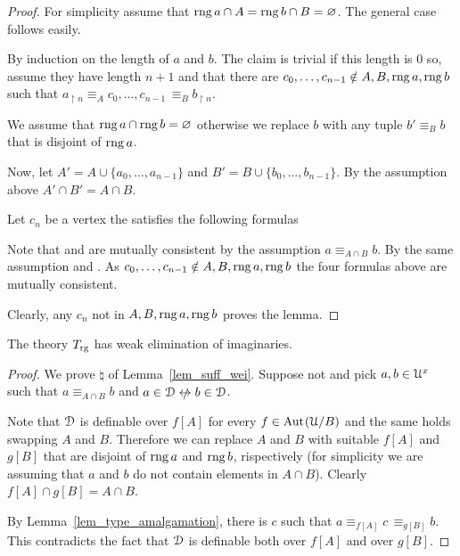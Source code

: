 \begin{proof}
  For simplicity assume that $\mathop{\rm rng} a\cap A=\mathop{\rm rng} b\cap B=\varnothing$.
  The general case follows easily.

  By induction on the length of $a$ and $b$. 
  The claim is trivial if this length is $0$ so, assume they have length $n+1$ and that there are $c_0,\dots,c_{n-1}\notin A, B,\mathop{\rm rng} a,\mathop{\rm rng} b$ such that $a_{\restriction n}\equiv_A c_0,\dots,c_{n-1}\,\equiv_B b_{\restriction n}$.

  We assume that $\mathop{\rm rng} a\cap\mathop{\rm rng} b=\varnothing$ otherwise we replace $b$ with any tuple $b'\equiv_Bb$ that is disjoint of $\mathop{\rm rng} a$.

  Now, let $A'=A\cup\{a_0,\dots,a_{n-1}\}$ and $B'=B\cup\{b_0,\dots,b_{n-1}\}$.
  By the assumption above $A'\cap B'=A\cap B$.

  Let $c_n$ be a vertex the satisfies the following formulas





  Note that  and  are mutually consistent by the assumption $a\equiv_{A\cap B}b$.
  By the same assumption  and .
  As $c_0,\dots,c_{n-1}\notin A, B,\mathop{\rm rng} a,\mathop{\rm rng} b$ the four formulas above are mutually consistent.

  Clearly, any $c_n$ not in $A, B,\mathop{\rm rng} a,\mathop{\rm rng} b$ proves the lemma.
\end{proof}

\begin{lemma}
  The theory $T_{\rm rg}$ has weak elimination of imaginaries.
\end{lemma}

\begin{proof}
  We prove ${\natural}$ of Lemma~\ref{lem_suff_wei}.
  Suppose not and pick $a,b\in\EuScript U^{x}$ such that $a\equiv_{A\cap B}b$ and $a\in\D\niff b\in\D$.

  Note that $\EuScript D$ is definable over $f[A]$ for every $f\in{\rm Aut\kern.15ex}(\EuScript U/B)$ and the same holds swapping $A$ and $B$.
  Therefore we can replace $A$ and $B$ with suitable $f[A]$ and $g[B]$ that are disjoint of $\mathop{\rm rng} a$ and $\mathop{\rm rng} b$, rispectively (for simplicity we are assuming that $a$ and $b$ do not contain elements in $A\cap B$).
  Clearly $f[A]\cap g[B]=A\cap B$.

  By Lemma~\ref{lem_type_amalgamation}, there is $c$ such that $a\equiv_{f[A]} c\,\equiv_{g[B]} b$.
  This contradicts the fact that $\EuScript D$ is definable both over $f[A]$ and over $g[B]$.
\end{proof}

